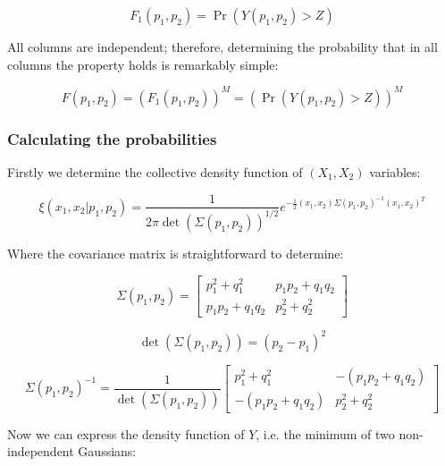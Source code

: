 \documentclass{article}
\theoremstyle{definition}
\begin{document}
\begin{equation}
    F_1(p_1,p_2) 
    =
    \Pr \left (
    Y(p_1,p_2)
    >
    Z
    \right )
\end{equation}

All columns are independent; therefore, determining the probability that in all columns the property holds is remarkably simple:

\begin{equation}
    F(p_1,p_2) 
    =
    \left (
    F_1(p_1,p_2) 
    \right )^M
    =
    \left (
    \Pr \left (
    Y(p_1,p_2)
    >
    Z
    \right )
    \right )^M
\end{equation}

\subsubsection{Calculating the probabilities}

Firstly we determine the collective density function of $(X_1,X_2)$ variables:

\begin{equation}
    \xi(x_1,x_2|p_1,p_2) = \frac{1}{2 \pi \det(\Sigma(p_1,p_2))^{1/2}} e^{- \frac{1}{2} (x_1,x_2) \Sigma(p_1,p_2)^{-1} (x_1,x_2)^T}
\end{equation}

Where the covariance matrix is straightforward to determine:

\begin{equation}
    \Sigma(p_1,p_2)=
    \begin{bmatrix}
    p_1^2+q_1^2 & p_1 p_2 + q_1 q_2 \\
    p_1 p_2 + q_1 q_2 & p_2^2+q_2^2
    \end{bmatrix}
\end{equation}

\begin{equation}
\label{eq:DetSigma}
    \det(\Sigma(p_1,p_2)) = (p_2-p_1)^2
\end{equation}

\begin{equation}
    \Sigma(p_1,p_2)^{-1} =
    \frac{1}{\det(\Sigma(p_1,p_2))} 
    \begin{bmatrix}
    p_1^2+q_1^2 & -(p_1 p_2 + q_1 q_2) \\
    -(p_1 p_2 + q_1 q_2) & p_2^2+q_2^2
    \end{bmatrix}
\end{equation}

Now we can express the density function of $Y$, i.e. the minimum of two non-independent Gaussians:
\end{document}
